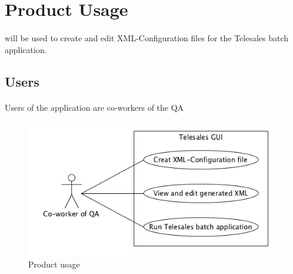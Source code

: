 \section{Product Usage}
\paragraph{}\app{} will be used to create and edit XML-Configuration files for the Telesales batch application. 

\subsection{Users}
\paragraph{}Users of the application are co-workers of the QA

\begin{figure}[h!]
\centering
\includegraphics[width=\textwidth]{d_usage.png}
\caption{Product usage}
\end{figure}
